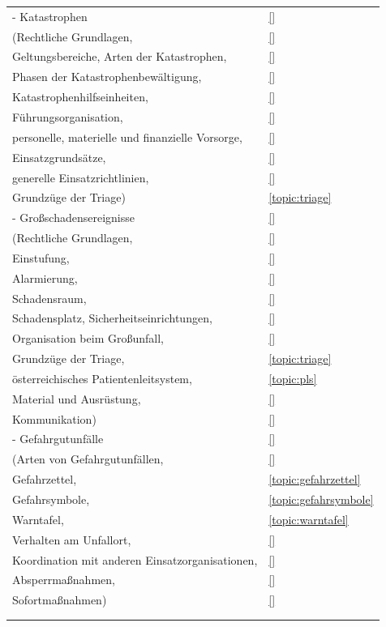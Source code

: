 \begin{xtabular}{p{10cm}p{5cm}}
- Katastrophen  
& 
\ref{}\noindent{}
\\
(Rechtliche Grundlagen, 
& 
\ref{}\noindent{}
\\
 Geltungsbereiche, Arten der Katastrophen,
& 
\ref{}\noindent{}
\\
Phasen der Katastrophenbewältigung,
& 
\ref{}\noindent{}
\\
Katastrophenhilfseinheiten,
& 
\ref{}\noindent{}
\\
Führungsorganisation,
& 
\ref{}\noindent{}
\\
personelle, materielle und finanzielle Vorsorge,
& 
\ref{}\noindent{}
\\
Einsatzgrundsätze,
& 
\ref{}\noindent{}
\\
generelle Einsatzrichtlinien,
& 
\ref{}\noindent{}
\\
Grundzüge der Triage)
& 
\ref{topic:triage}
\\
- Großschadensereignisse
& 
\ref{}\noindent{}
\\
(Rechtliche Grundlagen,
& 
\ref{}\noindent{}
\\
Einstufung,
& 
\ref{}\noindent{}
\\
Alarmierung,
& 
\ref{}\noindent{}
\\
Schadensraum,
& 
\ref{}\noindent{}
\\
Schadensplatz, Sicherheitseinrichtungen,
& 
\ref{}\noindent{}
\\
Organisation beim Großunfall, 
& 
\ref{}\noindent{}
\\
Grundzüge der Triage,
& 
\ref{topic:triage}
\\
österreichisches Patientenleitsystem,
& 
\ref{topic:pls}
\\
Material und Ausrüstung,
& 
\ref{}\noindent{}
\\
Kommunikation)
& 
\ref{}\noindent{}
\\
- Gefahrgutunfälle 
& 
\ref{}\noindent{}
\\
(Arten von Gefahrgutunfällen,
& 
\ref{}\noindent{}
\\
Gefahrzettel,
& 
\ref{topic:gefahrzettel}
\\
Gefahrsymbole,
& 
\ref{topic:gefahrsymbole}
\\
Warntafel, 
& 
\ref{topic:warntafel}
\\
Verhalten am Unfallort, 
& 
\ref{}\noindent{}
\\
Koordination mit anderen Einsatzorganisationen,
& 
\ref{}\noindent{}
\\
Absperrmaßnahmen,
& 
\ref{}\noindent{}
\\
Sofortmaßnahmen)
& 
\ref{}\noindent{}
\\
 \\\toprule
{}  




\end{xtabular}
